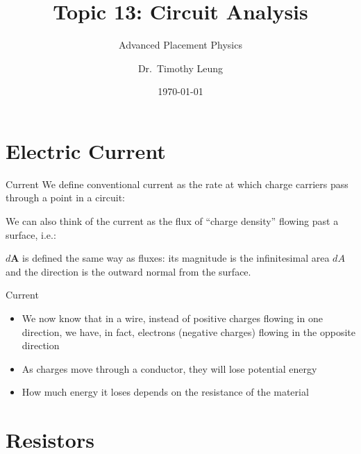 \documentclass[12pt,aspectratio=169]{beamer}
\title{Topic 13: Circuit Analysis}
\subtitle{Advanced Placement Physics}
\author[TML]{Dr.\ Timothy Leung}
\institute{Olympiads School\\Toronto, ON, Canada}
\date{\today}
\newcommand{\mb}[1]{\mathbf{#1}}
\newcommand{\eq}[2]{\vspace{#1}{\Large\begin{displaymath}#2\end{displaymath}}}
\begin{document}
\begin{frame}
  \maketitle
\end{frame}

\section{Electric Current}

\begin{frame}{Current}
  We define conventional current as the rate at which charge carriers pass
  through a point in a circuit:
  
  \eq{-.3in}{\boxed{I(t)=\frac{dQ}{dt}}}

  We can also think of the current as the flux of ``charge density'' flowing
  past a surface, i.e.:
  
  \eq{-.3in}{\boxed{I(t)=\int\mb{J}(t)\cdot d\mb{A}}}

  $d\mb{A}$ is defined the same way as fluxes: its magnitude is the
  infinitesimal area $dA$ and the direction is the outward normal from the
  surface.
\end{frame}



\begin{frame}{Current}
  \begin{itemize}
  \item We now know that in a wire, instead of positive charges flowing in one
    direction, we have, in fact, electrons (negative charges) flowing in the
    opposite direction
  \item As charges move through a conductor, they will lose potential energy
  \item How much energy it loses depends on the resistance of the material
  \end{itemize}
\end{frame}


\section{Resistors}
\end{document}
